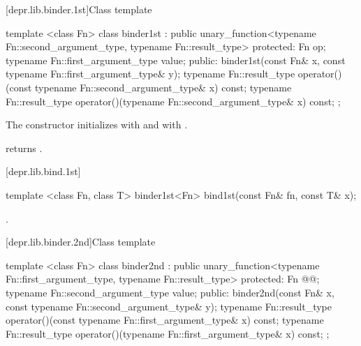 [depr.lib.binder.1st]{Class template }

%
\begin{itemdecl}
  template <class Fn>
  class binder1st
    : public unary_function<typename Fn::second_argument_type,
                            typename Fn::result_type> {
  protected:
    Fn                      op;
    typename Fn::first_argument_type value;
  public:
    binder1st(const Fn& x,
              const typename Fn::first_argument_type& y);
    typename Fn::result_type
      operator()(const typename Fn::second_argument_type& x) const;
    typename Fn::result_type
      operator()(typename Fn::second_argument_type& x) const;
  };
\end{itemdecl}

\begin{itemdescr}
\pnum
The constructor initializes  with  and 
with .

\pnum
{} returns .
\end{itemdescr}

[depr.lib.bind.1st]{}

%
\begin{itemdecl}
template <class Fn, class T>
  binder1st<Fn> bind1st(const Fn& fn, const T& x);
\end{itemdecl}

\begin{itemdescr}
\pnum
\returns
{}.
\end{itemdescr}

[depr.lib.binder.2nd]{Class template }

%
\begin{itemdecl}
  template <class Fn>
  class binder2nd
    : public unary_function<typename Fn::first_argument_type,
                            typename Fn::result_type> {
  protected:
    Fn                       @@;
    typename Fn::second_argument_type value;
  public:
    binder2nd(const Fn& x,
              const typename Fn::second_argument_type& y);
    typename Fn::result_type
      operator()(const typename Fn::first_argument_type& x) const;
    typename Fn::result_type
      operator()(typename Fn::first_argument_type& x) const;
  };
\end{itemdecl}

